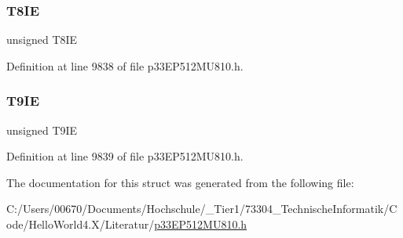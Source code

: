 \subsubsection{\texorpdfstring{T8\+IE}{T8IE}}
{\footnotesize\ttfamily unsigned T8\+IE}



Definition at line 9838 of file p33\+E\+P512\+M\+U810.\+h.

\mbox{\label{structtag_i_e_c3_b_i_t_s_ad64cadaad4d3854fe6b070ae3ad46be0}} 
\subsubsection{\texorpdfstring{T9\+IE}{T9IE}}
{\footnotesize\ttfamily unsigned T9\+IE}



Definition at line 9839 of file p33\+E\+P512\+M\+U810.\+h.



The documentation for this struct was generated from the following file\+:\begin{DoxyCompactItemize}
\item 
C\+:/\+Users/00670/\+Documents/\+Hochschule/\+\_\+\+Tier1/73304\+\_\+\+Technische\+Informatik/\+Code/\+Hello\+World4.\+X/\+Literatur/\hyperlink{p33_e_p512_m_u810_8h}{p33\+E\+P512\+M\+U810.\+h}\end{DoxyCompactItemize}
